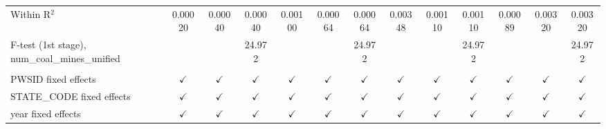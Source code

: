 \begin{table}[htbp]
\begin{adjustbox}{width = \textwidth, center}
\begin{tabular}{lcccccccccccc}
         Within R$^2$                                     & 0.00020       & 0.00040       & 0.00040       & 0.00100        & 0.00064        & 0.00064       & 0.00348         & 0.00110         & 0.00110        & 0.00089       & 0.00320        & 0.00320\\  
         F-test (1st stage), num\_coal\_mines\_unified    &               &               & 24.972        &                &                & 24.972        &                 &                 & 24.972         &               &                & 24.972\\  
          \\
         PWSID fixed effects                              & $\checkmark$  & $\checkmark$  & $\checkmark$  & $\checkmark$   & $\checkmark$   & $\checkmark$  & $\checkmark$    & $\checkmark$    & $\checkmark$   & $\checkmark$  & $\checkmark$   & $\checkmark$\\   
         STATE\_CODE fixed effects                        & $\checkmark$  & $\checkmark$  & $\checkmark$  & $\checkmark$   & $\checkmark$   & $\checkmark$  & $\checkmark$    & $\checkmark$    & $\checkmark$   & $\checkmark$  & $\checkmark$   & $\checkmark$\\   
         year fixed effects                               & $\checkmark$  & $\checkmark$  & $\checkmark$  & $\checkmark$   & $\checkmark$   & $\checkmark$  & $\checkmark$    & $\checkmark$    & $\checkmark$   & $\checkmark$  & $\checkmark$   & $\checkmark$\\   
         \bottomrule
      \end{tabular}
   \end{adjustbox}
\end{table}


